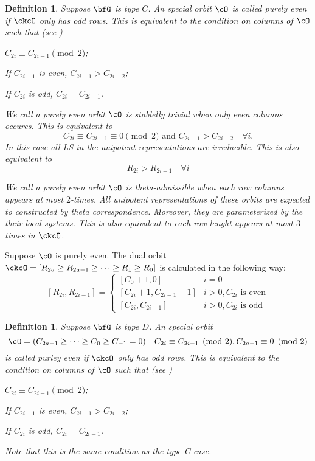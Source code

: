\documentclass[12pt,a4paper]{amsart}
\numberwithin{equation}{section}
\newtheorem{defn}[thm]{Definition}
\theoremstyle{remark}
\begin{document}
\begin{defn}
  Suppose $\bfG$ is type $C$.  An special orbit $\cO$ is called purely even if
  $\ckcO$ only has odd rows.
  This is equivalent to the condition on columns of $\cO$ such that (see )
  \begin{enumC}
  \item $C_{2i} \equiv C_{2i-1} \pmod{2}$; 
  \item 
   If $C_{2i-1}$ is even,  $C_{2i-1} > C_{2i-2}$; 
  \item
    If $C_{2i}$ is odd, $C_{2i}=C_{2i-1}$. 
  \end{enumC}
  We call a purely even orbit $\cO$ is stablelly trivial when only even columns
  occures. This is equivalent to  
  \[
    C_{2i} \equiv C_{2i-1} \equiv 0 \pmod{2}  \text{ and } C_{2i-1}>
    C_{2i-2} \quad \forall i.
  \]
  {\color{red} In this case all LS in the unipotent representations are
    irreducible. }
  This is also equivalent to
  \[
    R_{2i}>R_{2i-1} \quad \forall i
  \]

  We call a purely even orbit $\cO$ is theta-admissible when each row columns
  appears at most $2$-times.
  {\color{red} All unipotent representations of these orbits are expected to
    constructed by theta correspondence. Moreover, they are parameterized by the
    their local systems. 
  }
  This is also equivalent to each row lenght appears at most $3$-times in
  $\ckcO$. 
\end{defn}

Suppose $\cO$ is purely even. 
The dual orbit 
$\ckcO = [R_{2a}\geq R_{2a-1}\geq \cdots \geq R_1\geq R_0]$
is calculated in the following way: 
\[
  [R_{2i},R_{2i-1}] = \begin{cases}
    [C_0+1, 0] & i=0\\
    [C_{2i}+1, C_{2i-1}-1] & i>0, C_{2i} \text{ is even} \\
    [C_{2i},C_{2i-1}] & i>0, C_{2i} \text{ is odd}
  \end{cases}
\]


\begin{defn}
  Suppose $\bfG$ is type $D$.  An special orbit
  \[
    \cO=(C_{2a-1}\ge\dots \ge C_0\geq C_{-1}=0) \quad C_{2i}\equiv
    C_{2i-1}\pmod{2}, C_{2a-1} \equiv 0 \pmod{2}
  \]
  is called purley even if
  $\ckcO$ only has odd rows.
  This is equivalent to the condition on columns of $\cO$ such that (see )
  \begin{enumC}
  \item $C_{2i} \equiv C_{2i-1} \pmod{2}$; 
  \item 
   If $C_{2i-1}$ is even,  $C_{2i-1} > C_{2i-2}$; 
  \item
    If $C_{2i}$ is odd, $C_{2i}=C_{2i-1}$. 
  \end{enumC}
  Note that this is the same condition as the type C case. 
\end{defn}
\end{document}
